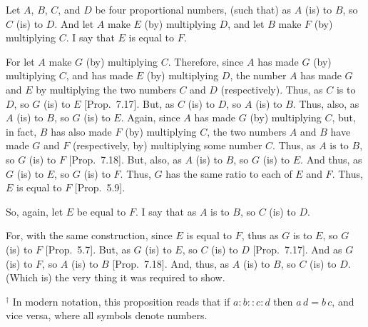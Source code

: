 \begin{Parallel}{}{}
{Let $A$, $B$, $C$, and $D$ be four proportional numbers, (such that) as $A$ (is) to
$B$, so $C$ (is) to $D$. And let $A$ make $E$ (by) multiplying $D$, and let
$B$ make $F$ (by) multiplying $C$. I say that $E$ is equal to $F$.

For let $A$ make $G$ (by) multiplying $C$. Therefore, since $A$ has made
$G$ (by) multiplying $C$, and has made $E$ (by) multiplying $D$, the number $A$
has made  $G$ and $E$ by multiplying the two numbers $C$ and $D$ (respectively).
Thus, as $C$ is to $D$, so $G$ (is) to $E$  [Prop.~7.17].
But, as $C$ (is) to $D$, so $A$ (is) to $B$. Thus, also, as $A$ (is) to $B$, so
$G$ (is) to $E$. Again, since $A$ has made $G$ (by) multiplying
$C$, but, in fact,  $B$ has also made $F$ (by)  multiplying $C$, the two
numbers $A$ and 
$B$ have made $G$ and $F$ (respectively, by) multiplying some
number $C$. Thus, as $A$ is to $B$, so $G$ (is) to $F$ [Prop.~7.18]. But, also, as $A$ (is) to $B$, so
$G$ (is) to $E$. And thus,  as $G$ (is) to $E$, so $G$ (is) to $F$. Thus, $G$ has the same
ratio to each of $E$ and $F$. Thus, $E$ is equal to $F$ [Prop.~5.9].

\epsfysize=2in
\centerline{}

So, again, let $E$ be equal to $F$. I say that as $A$ is to $B$, so
$C$  (is) to $D$.

For, with the same construction, since $E$ is equal to $F$, thus as
$G$ is to $E$, so $G$ (is) to $F$  [Prop.~5.7].
But, as $G$ (is) to $E$, so $C$ (is) to $D$ [Prop.~7.17].
And as $G$ (is) to $F$, so $A$ (is) to $B$ [Prop.~7.18].
And, thus, as $A$ (is) to $B$, so $C$ (is) to $D$. (Which is) the very thing it
was required to show.}
\end{Parallel}
{\footnotesize\noindent$^\dag$ In modern notation,  this
proposition reads that if $a:b::c:d$ then $a\,d=b\,c$, and
 vice versa, where all symbols denote numbers.}

